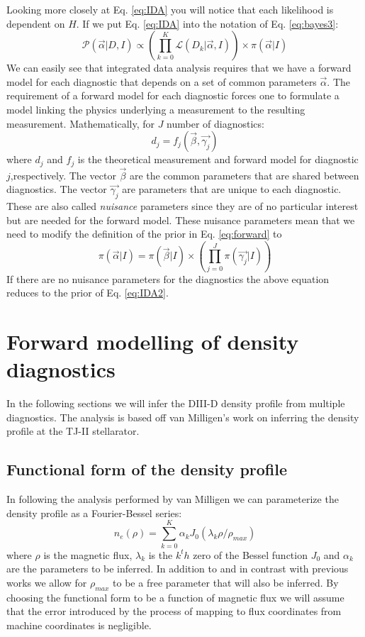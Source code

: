 \documentclass[12pt]{article}
\numberwithin{equation}{section}
\begin{document}
Looking more closely at Eq. \ref{eq:IDA} you will notice that each likelihood is dependent on $H$. 
If we put Eq. \ref{eq:IDA} into the notation of Eq. \ref{eq:bayes3}:
\begin{equation} \label{eq:IDA2}
	  {\mathcal{P}(\vec{\alpha}|D,I)} \propto {\left( \prod\limits_{k=0}^K{\mathcal{L}(D_k|\vec{\alpha},I)} \right)} \times 
	  {\pi(\vec{\alpha}|I)}
\end{equation}
We can easily see that integrated data analysis requires that we have a forward model for each diagnostic that depends on 
a set of common parameters $\vec{\alpha}$. 
The requirement of a forward model for each diagnostic forces one to formulate a model linking the physics underlying a measurement to 
the resulting measurement. Mathematically, for $J$ number of diagnostics:
\begin{equation} \label{eq:forward}
	d_j = f_j(\vec{\beta},\vec{\gamma_j})
\end{equation}
where $d_j$ and $f_j$ is the theoretical measurement and forward model for diagnostic $j$,respectively. The vector $\vec{\beta}$ are the common parameters that are shared between diagnostics. The vector $\vec{\gamma_j}$ are parameters that are unique to each diagnostic. These are also called \emph{nuisance} parameters since they are of no particular interest but are needed for the forward model. These nuisance parameters mean that we need to modify the definition of the prior in Eq. \ref{eq:forward} to 
\begin{equation} \label{eq:forwardprior}
	\pi ( \vec{\alpha} | I ) = \pi ( \vec{\beta}|I) \times \left( \prod \limits_{j=0}^{J} \pi ( \vec{\gamma_j}|I) \right)
\end{equation}
If there are no nuisance parameters for the diagnostics the above equation reduces to the prior of Eq. \ref{eq:IDA2}.
\section{Forward modelling of density diagnostics}
In the following sections we will infer the DIII-D density profile 
from multiple diagnostics. The analysis is based off van Milligen's 
work on inferring the density profile at the TJ-II stellarator.\cite
{van2011integrated} 
\subsection{Functional form of the density profile}
In following the analysis performed by van Milligen we can 
parameterize the density profile as a Fourier-Bessel series:
\begin{equation} \label{eq:densityform}
	n_e(\rho) = \sum\limits_{k=0}^K \alpha_k J_0(\lambda_k \rho/
	\rho_{max})
\end{equation}
where $\rho$ is the magnetic flux, $\lambda_k$ is the $k^th$ zero of 
the Bessel function $J_0$ and $\alpha_k$ are the parameters to be 
inferred. In addition to and in contrast with previous works we allow 
for $\rho_{max}$ to be a free parameter that will also be inferred. By 
choosing the functional form to be a function of magnetic flux we will 
assume that the error introduced by the process of mapping to flux 
coordinates from machine coordinates is negligible.
\end{document}
